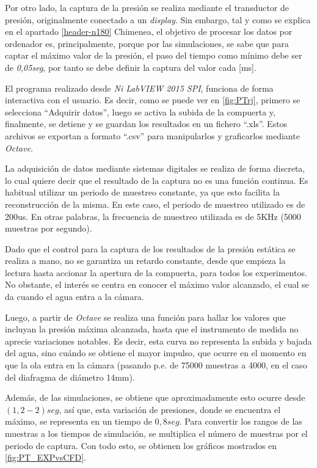 Por otro lado, la captura de la presión se realiza mediante el
transductor de presión, originalmente conectado a un \emph{display}. Sin
embargo, tal y como se explica en el apartado \ref{header-n180} Chimenea, el
objetivo de procesar los datos por ordenador es, principalmente, porque
por las simulaciones, se sabe que para captar el máximo valor de la
presión, el paso del tiempo como mínimo debe ser de \emph{0,05seg}, por
tanto se debe definir la captura del valor cada {[}ms{]}.

El programa realizado desde \emph{Ni LabVIEW 2015 SPI}, funciona de
forma interactiva con el usuario. Es decir, como se puede ver en
\autoref{fig:PTrj}, primero se selecciona ``Adquirir datos'', luego se
activa la subida de la compuerta y, finalmente, se detiene y se guardan
los resultados en un fichero ``.xls''. Estos archivos se exportan a
formato ``.csv'' para manipularlos y graficarlos mediante \emph{Octave}.

La adquisición de datos mediante sistemas digitales se realiza de forma
discreta, lo cual quiere decir que el resultado de la captura no es una
función continua. Es habitual utilizar un periodo de muestreo constante,
ya que esto facilita la reconstrucción de la misma. En este caso, el
periodo de muestreo utilizado es de 200us. En otras palabras, la
frecuencia de muestreo utilizada es de 5KHz (5000 muestras por segundo).

Dado que el control para la captura de los resultados de la presión
estática se realiza a mano, no se garantiza un retardo constante, desde
que empieza la lectura hasta accionar la apertura de la compuerta, para
todos los experimentos. No obstante, el interés se centra en conocer el
máximo valor alcanzado, el cual se da cuando el agua entra a la cámara.

Luego, a partir de \emph{Octave} se realiza una función para hallar los
valores que incluyan la presión máxima alcanzada, hasta que el
instrumento de medida no aprecie variaciones notables. Es decir, esta
curva no representa la subida y bajada del agua, sino cuándo se obtiene
el mayor impulso, que ocurre en el momento en que la ola entra en la
cámara (pasando p.e. de 75000 muestras a 4000, en el caso del diafragma
de diámetro 14mm).

Además, de las simulaciones, se obtiene que aproximadamente esto ocurre
desde \((1,2-2)seg\), así que, esta variación de presiones, donde se
encuentra el máximo, se representa en un tiempo de \(0,8seg\). Para
convertir los rangos de las muestras a los tiempos de simulación, se
multiplica el número de muestras por el periodo de captura. Con todo esto, se obtienen los gráficos mostrados en \autoref{fig:PT_EXPvsCFD}. 

